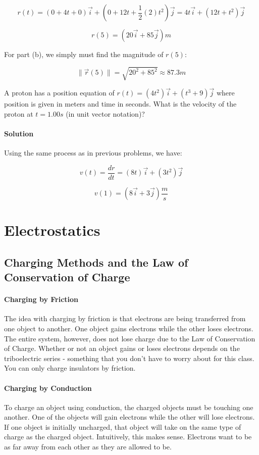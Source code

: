 \documentclass{scrartcl}
\theoremstyle{definition}
\begin{document}
	$$
	r(t) = (0+4t+0) \vec{i} + (0+12t+\frac{1}{2} (2)t^2) \vec{j} = 4t \vec{i} + (12t + t^2) \vec{j}
	$$
	
	$$
	r(5) = (20 \vec{i} + 85 \vec{j}) m
	$$
	
	\noindent For part (b), we simply must find the magnitude of $r(5)$:
	
	$$
	\| \vec{r}(5) \| = \sqrt{20^2 + 85^2} \approx 87.3 m
	$$
	
	\begin{example}
		A proton has a position equation of $r(t) = (4t^2) \vec{i} + (t^3 + 9) \vec{j}$ where position is given in meters and time in seconds. What is the velocity of the proton at $t=1.00s$ (in unit vector notation)?
	\end{example}
	
	\paragraph{Solution} \noindent Using the same process as in previous problems, we have:
	
	$$v(t) = \frac{dr}{dt} = (8t) \vec{i} + (3t^2) \vec{j}$$
	
	$$
	v(1) = (8 \vec{i} + 3\vec{j}) \frac{m}{s}
	$$
	
	\newpage
	
	\section{Electrostatics}
	
	\subsection{Charging Methods and the Law of Conservation of Charge}
	
	\paragraph{Charging by Friction} The idea with charging by friction is that electrons are being transferred from one object to another. One object gains electrons while the other loses electrons. The entire system, however, does not lose charge due to the Law of Conservation of Charge. Whether or not an object gains or loses electrons depends on the triboelectric series - something that you don't have to worry about for this class. You can only charge insulators by friction. 
	
	\paragraph{Charging by Conduction} To charge an object using conduction, the charged objects must be touching one another. One of the objects will gain electrons while the other will lose electrons. If one object is initially uncharged, that object will take on the same type of charge as the charged object. Intuitively, this makes sense. Electrons want to be as far away from each other as they are allowed to be.
	
\end{document}
